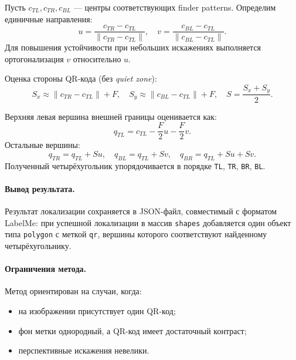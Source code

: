 Пусть $c_{TL}, c_{TR}, c_{BL}$ --- центры соответствующих finder patterns.
Определим единичные направления:
\[
	u = \frac{c_{TR}-c_{TL}}{\|c_{TR}-c_{TL}\|}, \quad
	v = \frac{c_{BL}-c_{TL}}{\|c_{BL}-c_{TL}\|}.
\]
Для повышения устойчивости при небольших искажениях выполняется ортогонализация $v$ относительно $u$.

Оценка стороны QR-кода (без \textit{quiet zone}):
\[
	S_x \approx \|c_{TR}-c_{TL}\| + F,\quad
	S_y \approx \|c_{BL}-c_{TL}\| + F,\quad
	S=\frac{S_x+S_y}{2}.
\]

Верхняя левая вершина внешней границы оценивается как:
\[
	q_{TL}=c_{TL}-\frac{F}{2}u-\frac{F}{2}v.
\]
Остальные вершины:
\[
	q_{TR}=q_{TL}+Su,\quad
	q_{BL}=q_{TL}+Sv,\quad
	q_{BR}=q_{TL}+Su+Sv.
\]
Полученный четырёхугольник упорядочивается в порядке \texttt{TL}, \texttt{TR}, \texttt{BR}, \texttt{BL}.

\paragraph{Вывод результата.}
Результат локализации сохраняется в JSON-файл, совместимый с форматом LabelMe: при успешной локализации в массив \texttt{shapes} добавляется один объект типа \texttt{polygon} с меткой \texttt{qr}, вершины которого соответствуют найденному четырёхугольнику.

\paragraph{Ограничения метода.}
Метод ориентирован на случаи, когда:
\begin{itemize}
	\item на изображении присутствует один QR-код;
	\item фон метки однородный, а QR-код имеет достаточный контраст;
	\item перспективные искажения невелики.
\end{itemize}

